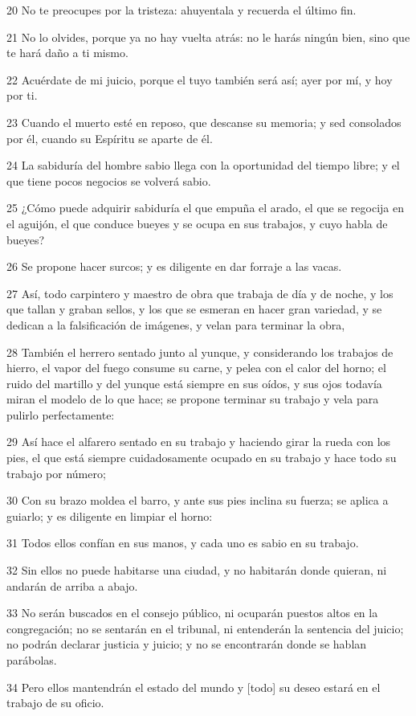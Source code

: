 \par 20 No te preocupes por la tristeza: ahuyentala y recuerda el último fin.
\par 21 No lo olvides, porque ya no hay vuelta atrás: no le harás ningún bien, sino que te hará daño a ti mismo.
\par 22 Acuérdate de mi juicio, porque el tuyo también será así; ayer por mí, y hoy por ti.
\par 23 Cuando el muerto esté en reposo, que descanse su memoria; y sed consolados por él, cuando su Espíritu se aparte de él.
\par 24 La sabiduría del hombre sabio llega con la oportunidad del tiempo libre; y el que tiene pocos negocios se volverá sabio.
\par 25 ¿Cómo puede adquirir sabiduría el que empuña el arado, el que se regocija en el aguijón, el que conduce bueyes y se ocupa en sus trabajos, y cuyo habla de bueyes?
\par 26 Se propone hacer surcos; y es diligente en dar forraje a las vacas.
\par 27 Así, todo carpintero y maestro de obra que trabaja de día y de noche, y los que tallan y graban sellos, y los que se esmeran en hacer gran variedad, y se dedican a la falsificación de imágenes, y velan para terminar la obra,
\par 28 También el herrero sentado junto al yunque, y considerando los trabajos de hierro, el vapor del fuego consume su carne, y pelea con el calor del horno; el ruido del martillo y del yunque está siempre en sus oídos, y sus ojos todavía miran el modelo de lo que hace; se propone terminar su trabajo y vela para pulirlo perfectamente:
\par 29 Así hace el alfarero sentado en su trabajo y haciendo girar la rueda con los pies, el que está siempre cuidadosamente ocupado en su trabajo y hace todo su trabajo por número;
\par 30 Con su brazo moldea el barro, y ante sus pies inclina su fuerza; se aplica a guiarlo; y es diligente en limpiar el horno:
\par 31 Todos ellos confían en sus manos, y cada uno es sabio en su trabajo.
\par 32 Sin ellos no puede habitarse una ciudad, y no habitarán donde quieran, ni andarán de arriba a abajo.
\par 33 No serán buscados en el consejo público, ni ocuparán puestos altos en la congregación; no se sentarán en el tribunal, ni entenderán la sentencia del juicio; no podrán declarar justicia y juicio; y no se encontrarán donde se hablan parábolas.
\par 34 Pero ellos mantendrán el estado del mundo y [todo] su deseo estará en el trabajo de su oficio.

